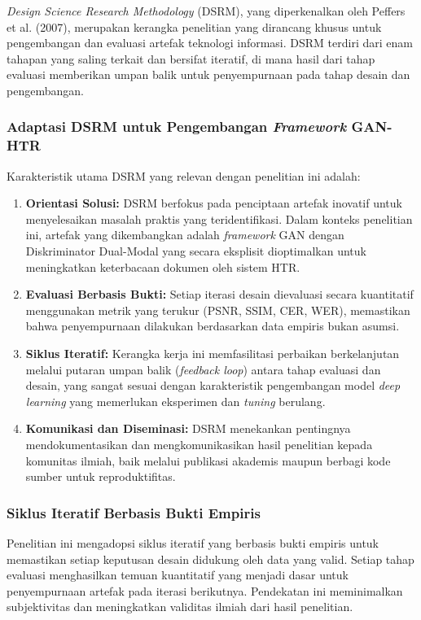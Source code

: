 \documentclass[12pt,a4paper]{article}
\begin{document}
\textit{Design Science Research Methodology} (DSRM), yang diperkenalkan oleh Peffers et al. (2007), merupakan kerangka penelitian yang dirancang khusus untuk pengembangan dan evaluasi artefak teknologi informasi. DSRM terdiri dari enam tahapan yang saling terkait dan bersifat iteratif, di mana hasil dari tahap evaluasi memberikan umpan balik untuk penyempurnaan pada tahap desain dan pengembangan.

\subsubsection{Adaptasi DSRM untuk Pengembangan \textit{Framework} GAN-HTR}
Karakteristik utama DSRM yang relevan dengan penelitian ini adalah:

\begin{enumerate}[label=\arabic*., leftmargin=*, nosep]
\item \textbf{Orientasi Solusi:} DSRM berfokus pada penciptaan artefak inovatif untuk menyelesaikan masalah praktis yang teridentifikasi. Dalam konteks penelitian ini, artefak yang dikembangkan adalah \textit{framework} GAN dengan Diskriminator Dual-Modal yang secara eksplisit dioptimalkan untuk meningkatkan keterbacaan dokumen oleh sistem HTR.

\item \textbf{Evaluasi Berbasis Bukti:} Setiap iterasi desain dievaluasi secara kuantitatif menggunakan metrik yang terukur (PSNR, SSIM, CER, WER), memastikan bahwa penyempurnaan dilakukan berdasarkan data empiris bukan asumsi.

\item \textbf{Siklus Iteratif:} Kerangka kerja ini memfasilitasi perbaikan berkelanjutan melalui putaran umpan balik (\textit{feedback loop}) antara tahap evaluasi dan desain, yang sangat sesuai dengan karakteristik pengembangan model \textit{deep learning} yang memerlukan eksperimen dan \textit{tuning} berulang.

\item \textbf{Komunikasi dan Diseminasi:} DSRM menekankan pentingnya mendokumentasikan dan mengkomunikasikan hasil penelitian kepada komunitas ilmiah, baik melalui publikasi akademis maupun berbagi kode sumber untuk reproduktifitas.
\end{enumerate}

\subsubsection{Siklus Iteratif Berbasis Bukti Empiris}
Penelitian ini mengadopsi siklus iteratif yang berbasis bukti empiris untuk memastikan setiap keputusan desain didukung oleh data yang valid. Setiap tahap evaluasi menghasilkan temuan kuantitatif yang menjadi dasar untuk penyempurnaan artefak pada iterasi berikutnya. Pendekatan ini meminimalkan subjektivitas dan meningkatkan validitas ilmiah dari hasil penelitian.
\end{document}
